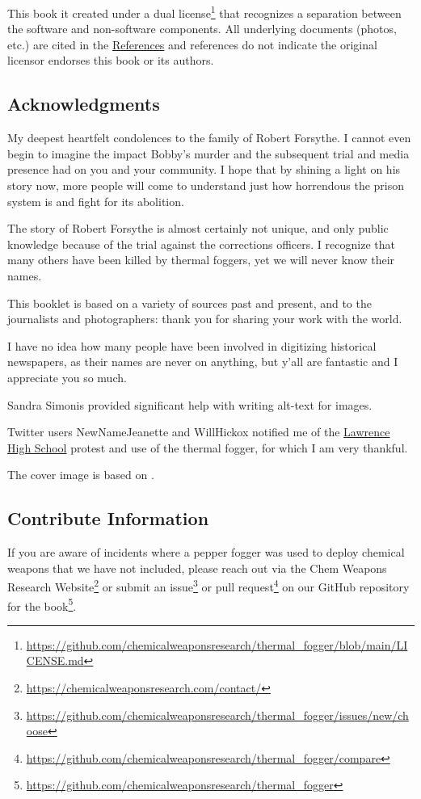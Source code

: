 \documentclass[
  11pt,
]{krantz}
\renewcommand{\href}[2]{#2\footnote{\url{#1}}}
\begin{document}
This book it created under a \href{https://github.com/chemicalweaponsresearch/thermal_fogger/blob/main/LICENSE.md}{dual license} that recognizes a separation between the software and non-software components.
All underlying documents (photos, etc.) are cited in the \protect\hyperlink{References}{References} and references do not indicate the original licensor endorses this book or its authors.

\hypertarget{acknowledgments}{%
\subsection*{Acknowledgments}\label{acknowledgments}}


My deepest heartfelt condolences to the family of Robert Forsythe.
I cannot even begin to imagine the impact Bobby's murder and the subsequent trial and media presence had on you and your community.
I hope that by shining a light on his story now, more people will come to understand just how horrendous the prison system is and fight for its abolition.

The story of Robert Forsythe is almost certainly not unique, and only public knowledge because of the trial against the corrections officers.
I recognize that many others have been killed by thermal foggers, yet we will never know their names.

This booklet is based on a variety of sources past and present, and to the journalists and photographers: thank you for sharing your work with the world.

I have no idea how many people have been involved in digitizing historical newspapers, as their names are never on anything, but y'all are fantastic and I appreciate you so much.

Sandra Simonis provided significant help with writing alt-text for images.

Twitter users NewNameJeanette and WillHickox notified me of the \protect\hyperlink{Lawrence1970_04_21}{Lawrence High School} protest and use of the thermal fogger, for which I am very thankful.

The cover image is based on \citet{Lewis-Rolland2021a}.

\hypertarget{contribute-information}{%
\subsection*{Contribute Information}\label{contribute-information}}


If you are aware of incidents where a pepper fogger was used to deploy chemical weapons that we have not included, please reach out \href{https://chemicalweaponsresearch.com/contact/}{via the Chem Weapons Research Website} or submit an \href{https://github.com/chemicalweaponsresearch/thermal_fogger/issues/new/choose}{issue} or \href{https://github.com/chemicalweaponsresearch/thermal_fogger/compare}{pull request} on our \href{https://github.com/chemicalweaponsresearch/thermal_fogger}{GitHub repository for the book}.
\end{document}
